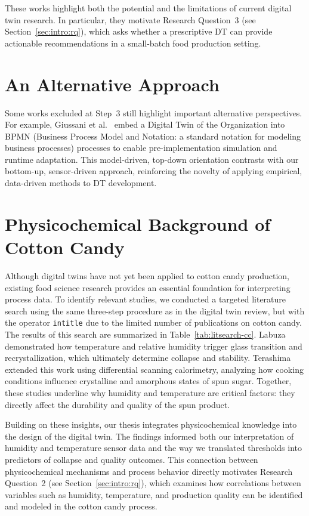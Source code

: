 These works highlight both the potential and the limitations of current digital twin research. In particular, they motivate Research Question~3 (see Section~\ref{sec:intro:rq}), which asks whether a prescriptive DT can provide actionable recommendations in a small-batch food production setting.

\section*{An Alternative Approach}
Some works excluded at Step~3 still highlight important alternative perspectives. For example, Giussani et al.\ \cite{11015088} embed a Digital Twin of the Organization into BPMN (Business Process Model and Notation: a standard notation for modeling business processes) processes to enable pre-implementation simulation and runtime adaptation. This model-driven, top-down orientation contrasts with our bottom-up, sensor-driven approach, reinforcing the novelty of applying empirical, data-driven methods to DT development.

\section*{Physicochemical Background of Cotton Candy}
Although digital twins have not yet been applied to cotton candy production, existing food science research provides an essential foundation for interpreting process data. To identify relevant studies, we conducted a targeted literature search using the same three-step procedure as in the digital twin review, but with the operator \texttt{intitle} due to the limited number of publications on cotton candy. The results of this search are summarized in Table~\ref{tab:litsearch-cc}. Labuza \cite{labuza} demonstrated how temperature and relative humidity trigger glass transition and recrystallization, which ultimately determine collapse and stability. Terashima \cite{TERASHIMA2022139953} extended this work using differential scanning calorimetry, analyzing how cooking conditions influence crystalline and amorphous states of spun sugar. Together, these studies underline why humidity and temperature are critical factors: they directly affect the durability and quality of the spun product.

Building on these insights, our thesis integrates physicochemical knowledge into the design of the digital twin. The findings informed both our interpretation of humidity and temperature sensor data and the way we translated thresholds into predictors of collapse and quality outcomes. This connection between physicochemical mechanisms and process behavior directly motivates Research Question~2 (see Section~\ref{sec:intro:rq}), which examines how correlations between variables such as humidity, temperature, and production quality can be identified and modeled in the cotton candy process.

